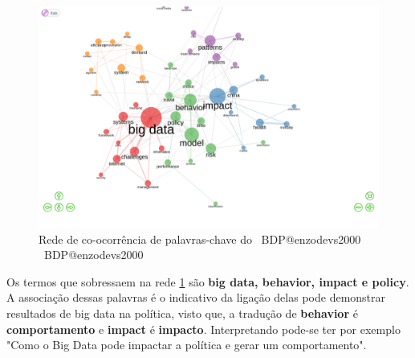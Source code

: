  \begin{figure}[H]
    \centering
    \includegraphics[width=1\textwidth]{experiments/enzodevs2000/AnaliseBibliometrica/BigDataInPolicy/Figures/Graficos/NovoDataset/Conceitual/conceptual_network.png}
    \caption{Rede de co-ocorrência de palavras-chave do \dataset\ BDP@enzodevs2000
    \dataset\ BDP@enzodevs2000}
    \label{fig:enzodevs2000:BDP:newdataset:conceitual:network}
\end{figure}

Os termos que sobressaem na rede \ref{fig:enzodevs2000:BDP:newdataset:conceitual:network} são \textbf{big data, behavior, impact e policy}. A associação dessas palavras é o indicativo da ligação delas pode demonstrar resultados de big data na política, visto que, a tradução de \textbf{behavior} é \textbf{comportamento} e \textbf{impact} é \textbf{impacto}. Interpretando pode-se ter por exemplo "Como o Big Data pode impactar a política e gerar um comportamento".

